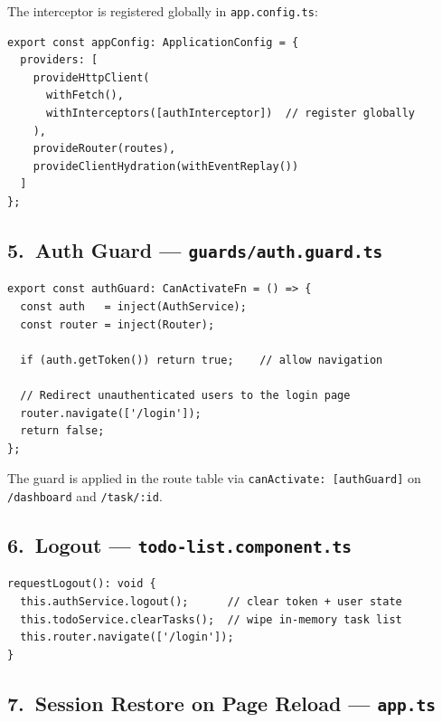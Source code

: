 \documentclass[11pt,a4paper]{article}
\begin{document}
The interceptor is registered globally in \texttt{app.config.ts}:
\begin{lstlisting}[style=ts, language={[Sharp]C}]
export const appConfig: ApplicationConfig = {
  providers: [
    provideHttpClient(
      withFetch(),
      withInterceptors([authInterceptor])  // register globally
    ),
    provideRouter(routes),
    provideClientHydration(withEventReplay())
  ]
};
\end{lstlisting}

\subsection*{5.\ Auth Guard — \texttt{guards/auth.guard.ts}}

\begin{lstlisting}[style=ts, language={[Sharp]C}]
export const authGuard: CanActivateFn = () => {
  const auth   = inject(AuthService);
  const router = inject(Router);

  if (auth.getToken()) return true;    // allow navigation

  // Redirect unauthenticated users to the login page
  router.navigate(['/login']);
  return false;
};
\end{lstlisting}

The guard is applied in the route table via \texttt{canActivate: [authGuard]} on
\texttt{/dashboard} and \texttt{/task/:id}.

\subsection*{6.\ Logout — \texttt{todo-list.component.ts}}

\begin{lstlisting}[style=ts, language={[Sharp]C}]
requestLogout(): void {
  this.authService.logout();      // clear token + user state
  this.todoService.clearTasks();  // wipe in-memory task list
  this.router.navigate(['/login']);
}
\end{lstlisting}

\subsection*{7.\ Session Restore on Page Reload — \texttt{app.ts}}
\end{document}
